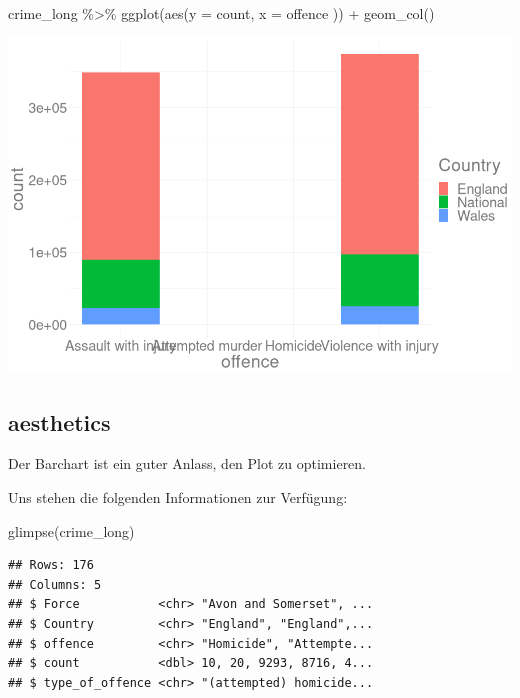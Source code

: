 \documentclass[
]{book}
\newenvironment{Shaded}{\begin{snugshade}}{\end{snugshade}}
\newcommand{\AttributeTok}[1]{\textcolor[rgb]{0.77,0.63,0.00}{#1}}
\newcommand{\FunctionTok}[1]{\textcolor[rgb]{0.00,0.00,0.00}{#1}}
\newcommand{\NormalTok}[1]{#1}
\newcommand{\SpecialCharTok}[1]{\textcolor[rgb]{0.00,0.00,0.00}{#1}}
\begin{document}
\begin{Shaded}
\begin{Highlighting}[]
\NormalTok{crime\_long }\SpecialCharTok{\%\textgreater{}\%}
  \FunctionTok{ggplot}\NormalTok{(}\FunctionTok{aes}\NormalTok{(}\AttributeTok{y =}\NormalTok{ count,}
             \AttributeTok{x =}\NormalTok{ offence}
\NormalTok{             )) }\SpecialCharTok{+}
  \FunctionTok{geom\_col}\NormalTok{()}
\end{Highlighting}
\end{Shaded}

\begin{center}\includegraphics[width=12in]{imgs/pts6} \end{center}

\hypertarget{aesthetics-4}{%
\subsection{aesthetics}\label{aesthetics-4}}

Der Barchart ist ein guter Anlass, den Plot zu optimieren.

Uns stehen die folgenden Informationen zur Verfügung:

\begin{Shaded}
\begin{Highlighting}[]
\FunctionTok{glimpse}\NormalTok{(crime\_long)}
\end{Highlighting}
\end{Shaded}

\begin{verbatim}
## Rows: 176
## Columns: 5
## $ Force           <chr> "Avon and Somerset", ...
## $ Country         <chr> "England", "England",...
## $ offence         <chr> "Homicide", "Attempte...
## $ count           <dbl> 10, 20, 9293, 8716, 4...
## $ type_of_offence <chr> "(attempted) homicide...
\end{verbatim}
\end{document}
